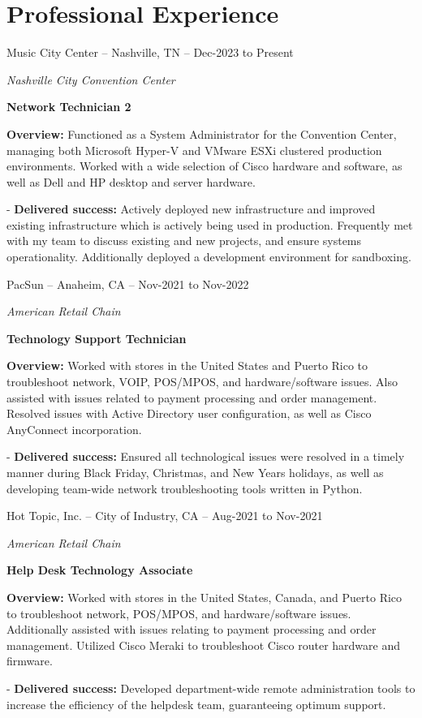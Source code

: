 \documentclass[a4paper]{article}
\begin{document}
\section{Professional Experience}
\begin{minipage}{\textwidth}
Music City Center -- Nashville, TN -- Dec-2023 to Present\par
\textit{Nashville City Convention Center}\par
\textbf{Network Technician 2}

\medskip
\textbf{Overview:} Functioned as a System Administrator for the Convention Center, managing both Microsoft Hyper-V and VMware ESXi clustered production environments. Worked with a wide selection of Cisco hardware and software, as well as Dell and HP desktop and server hardware.

\medskip
- \textbf{Delivered success:} Actively deployed new infrastructure and improved existing infrastructure which is actively being used in production. Frequently met with my team to discuss existing and new projects, and ensure systems operationality. Additionally deployed a development environment for sandboxing.
\end{minipage}

\vspace{20pt}
\begin{minipage}{\textwidth}
PacSun -- Anaheim, CA -- Nov-2021 to Nov-2022\par
\textit{American Retail Chain}\par
\textbf{Technology Support Technician}

\medskip
\textbf{Overview:} Worked with stores in the United States and Puerto Rico to troubleshoot network, VOIP, POS/MPOS, and hardware/software issues. Also assisted with issues related to payment processing and order management. Resolved issues with Active Directory user configuration, as well as Cisco AnyConnect incorporation.

\medskip
- \textbf{Delivered success:} Ensured all technological issues were resolved in a timely manner during Black Friday, Christmas, and New Years holidays, as well as developing team-wide network troubleshooting tools written in Python.
\end{minipage}

\vspace{20pt}
\begin{minipage}{\textwidth}
Hot Topic, Inc. -- City of Industry, CA -- Aug-2021 to Nov-2021\par
\textit{American Retail Chain}\par
\textbf{Help Desk Technology Associate}

\medskip
\textbf{Overview:} Worked with stores in the United States, Canada, and Puerto Rico to troubleshoot network, POS/MPOS, and hardware/software issues. Additionally assisted with issues relating to payment processing and order management. Utilized Cisco Meraki to troubleshoot Cisco router hardware and firmware.

\medskip
- \textbf{Delivered success:} Developed department-wide remote administration tools to increase the efficiency of the helpdesk team, guaranteeing optimum support.
\end{minipage}
\end{document}
